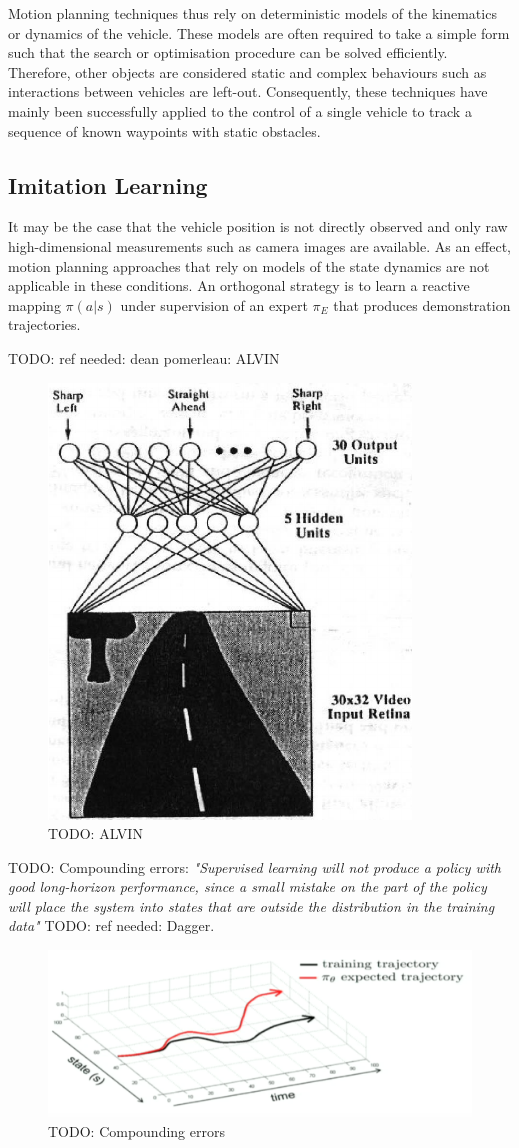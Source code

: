 Motion planning techniques thus rely on deterministic models of the kinematics or dynamics of the vehicle. These models are often required to take a simple form such that the search or optimisation procedure can be solved efficiently. Therefore, other objects are considered static and complex behaviours such as interactions between vehicles are left-out. Consequently, these techniques have mainly been successfully applied to the control of a single vehicle to track a sequence of known waypoints with static obstacles.

\subsection{Imitation Learning}

It may be the case that the vehicle position is not directly observed and only raw high-dimensional measurements such as camera images are available. As an effect, motion planning approaches that rely on models of the state dynamics are not applicable in these conditions. An orthogonal strategy is to learn a reactive mapping $\pi(a|s)$ under supervision of an expert $\pi_E$ that produces demonstration trajectories.

TODO: ref needed: dean pomerleau: ALVIN
\begin{figure}[tp]
	\centering
	\includegraphics[width=0.4\linewidth]{img/alvinn}
	\caption{TODO: ALVIN}
\end{figure}

TODO: Compounding errors: \emph{"Supervised learning will not produce a policy with good long-horizon
performance, since a small mistake on the part of the policy will place the system
into states that are outside the distribution in the training data"} \citep{Levine2016}
TODO: ref needed: Dagger.

\begin{figure}[tp]
	\centering
	\includegraphics[width=0.7\linewidth]{img/cp4}
	\caption{TODO: Compounding errors}
\end{figure}

